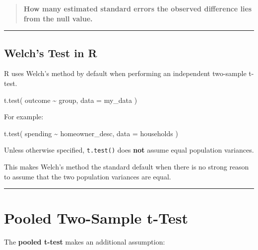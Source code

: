 \documentclass[
  letterpaper,
  DIV=11,
  numbers=noendperiod]{scrreprt}
\newenvironment{Shaded}{\begin{snugshade}}{\end{snugshade}}
\newcommand{\AttributeTok}[1]{\textcolor[rgb]{0.40,0.45,0.13}{#1}}
\newcommand{\FunctionTok}[1]{\textcolor[rgb]{0.28,0.35,0.67}{#1}}
\newcommand{\NormalTok}[1]{\textcolor[rgb]{0.00,0.23,0.31}{#1}}
\newcommand{\SpecialCharTok}[1]{\textcolor[rgb]{0.37,0.37,0.37}{#1}}
\begin{document}
\begin{quote}
\textbf{How many estimated standard errors the observed difference lies
from the null value.}
\end{quote}

\begin{center}\rule{0.5\linewidth}{0.5pt}\end{center}

\section{Welch's Test in R}\label{welchs-test-in-r}

R uses Welch's method by default when performing an independent
two-sample t-test.

\begin{Shaded}
\begin{Highlighting}[]
\FunctionTok{t.test}\NormalTok{(}
\NormalTok{    outcome }\SpecialCharTok{\textasciitilde{}}\NormalTok{ group,}
    \AttributeTok{data =}\NormalTok{ my\_data}
\NormalTok{)}
\end{Highlighting}
\end{Shaded}

For example:

\begin{Shaded}
\begin{Highlighting}[]
\FunctionTok{t.test}\NormalTok{(}
\NormalTok{    spending }\SpecialCharTok{\textasciitilde{}}\NormalTok{ homeowner\_desc,}
    \AttributeTok{data =}\NormalTok{ households}
\NormalTok{)}
\end{Highlighting}
\end{Shaded}

Unless otherwise specified, \texttt{t.test()} does \textbf{not} assume
equal population variances.

This makes Welch's method the standard default when there is no strong
reason to assume that the two population variances are equal.

\begin{center}\rule{0.5\linewidth}{0.5pt}\end{center}


\chapter{Pooled Two-Sample t-Test}\label{pooled-two-sample-t-test}

The \textbf{pooled t-test} makes an additional assumption:
\end{document}
